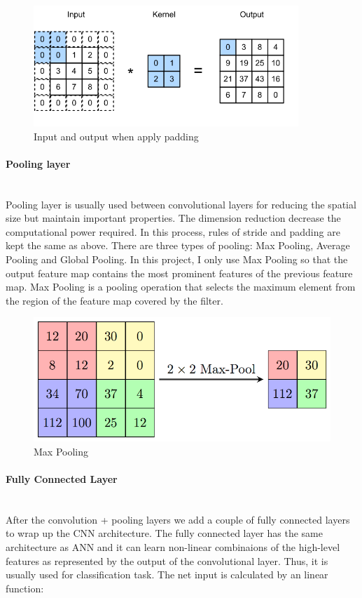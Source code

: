 \documentclass[runningheads]{llncs}
\begin{document}
\begin{figure}[H]
    \centering
    \includegraphics[width=10cm]{Figures/padding.png}
    \caption{Input and output when apply padding}
    \label{fig:padding}
\end{figure}

\paragraph{\large\bf Pooling layer}\hspace*{\fill} \\
Pooling layer is usually used between convolutional layers for reducing the spatial size but maintain important properties. The dimension reduction decrease the computational power required. In this process, rules of stride and padding are kept the same as above. There are three types of pooling: Max Pooling, Average Pooling and Global Pooling. In this project, I only use Max Pooling so that the output feature map contains the most prominent features of the previous feature map. Max Pooling is a pooling operation that selects the maximum element from the region of the feature map covered by the filter.

\begin{figure}[H]
    \centering
    \includegraphics[scale=1.3]{Figures/pooling.png}
    \caption{Max Pooling}
    \label{fig:pooling}
\end{figure}

\paragraph{\large\bf Fully Connected Layer}\hspace*{\fill} \\
After the convolution + pooling layers we add a couple of fully connected layers to wrap up the CNN architecture. The fully connected layer has the same architecture as ANN and it can learn non-linear combinaions of the high-level features as represented by the output of the convolutional layer. Thus, it is usually used for classification task. The net input is calculated by an linear function:
\end{document}
